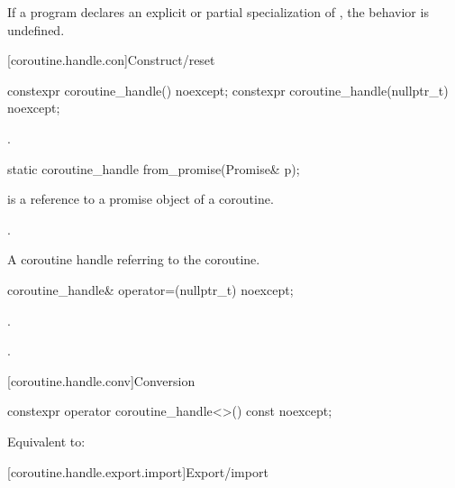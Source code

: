 \pnum
If a program declares an explicit or partial specialization of
, the behavior is undefined.

[coroutine.handle.con]{Construct/reset}

%
\begin{itemdecl}
constexpr coroutine_handle() noexcept;
constexpr coroutine_handle(nullptr_t) noexcept;
\end{itemdecl}

\begin{itemdescr}
\pnum
\ensures
{}.
\end{itemdescr}

%
\begin{itemdecl}
static coroutine_handle from_promise(Promise& p);
\end{itemdecl}

\begin{itemdescr}
\pnum
\expects
{} is a reference to a promise object of a coroutine.

\pnum
\ensures
{}.

\pnum
\returns
A coroutine handle  referring to the coroutine.
\end{itemdescr}

%
\begin{itemdecl}
coroutine_handle& operator=(nullptr_t) noexcept;
\end{itemdecl}

\begin{itemdescr}
\pnum
\ensures
{}.

\pnum
\returns
{}.
\end{itemdescr}

[coroutine.handle.conv]{Conversion}

%
\begin{itemdecl}
constexpr operator coroutine_handle<>() const noexcept;
\end{itemdecl}

\begin{itemdescr}
\pnum
\effects
Equivalent to: 
\end{itemdescr}

[coroutine.handle.export.import]{Export/import}

